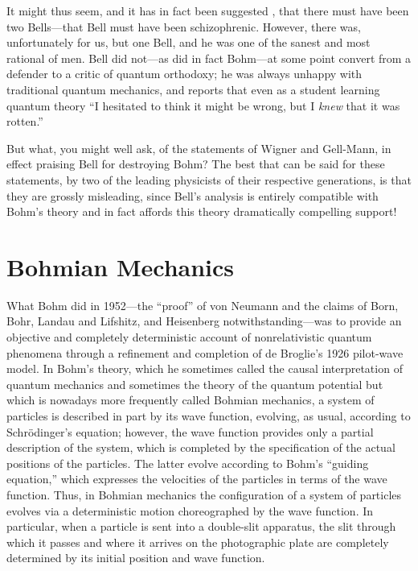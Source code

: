 It might thus seem, and it has in fact been suggested \cite{Speiser}, that
there must have been two Bells---that Bell must have been
schizophrenic. However, there was, unfortunately for us, but one Bell, and
he was one of the sanest and most rational of men. Bell did not---as did in
fact Bohm---at some point convert from a defender to a critic of quantum
orthodoxy; he was always unhappy with traditional quantum mechanics, and
reports \cite{Bernstein} that even as a student learning quantum theory ``I
hesitated to think it might be wrong, but I {\it knew\/} that it was
rotten.''

But what, you might well ask, of the statements of Wigner and Gell-Mann, in
effect praising Bell for destroying Bohm?  The best that can be said for
these statements, by two of the leading physicists of their respective
generations, is that they are grossly misleading, since Bell's analysis is
entirely compatible with Bohm's theory and in fact affords this theory
dramatically compelling support!

\section*{Bohmian Mechanics}

What Bohm did in 1952---the ``proof'' of von Neumann and the claims of
Born, Bohr, Landau and Lifshitz, and Heisenberg notwithstanding---was to
provide an objective and completely deterministic account of
nonrelativistic quantum phenomena through a refinement and completion of de
Broglie's 1926 pilot-wave model.  In Bohm's theory, which he sometimes called
the causal interpretation of quantum mechanics and sometimes the theory of
the quantum potential but which is nowadays more frequently called Bohmian
mechanics,  a system of particles is described in part by its wave
function, evolving, as usual, according to Schr\"odinger's equation;
however, the wave function provides only a partial description of the
system, which is completed by the specification of the actual positions of
the particles. The latter evolve according to Bohm's ``guiding equation,''
which expresses the velocities of the particles in terms of the wave
function.  Thus, in Bohmian mechanics the configuration of a system of
particles evolves via a deterministic motion choreographed by the wave
function. In particular, when a particle is sent into a double-slit
apparatus, the slit through which it passes and where it arrives on the
photographic plate are completely determined by its initial position and
wave function.

